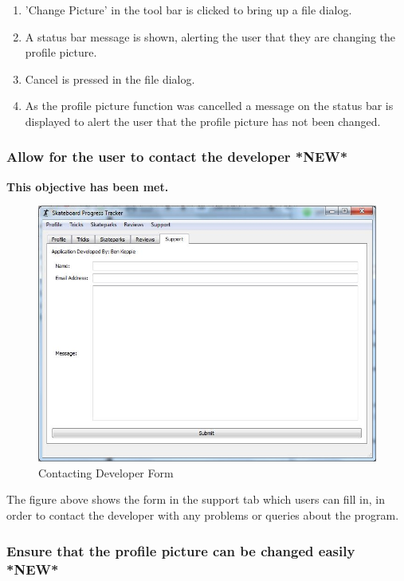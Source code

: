 \begin{enumerate}
\item 'Change Picture' in the tool bar is clicked to bring up a file dialog.
\item A status bar message is shown, alerting the user that they are changing the profile picture.
\item Cancel is pressed in the file dialog.
\item As the profile picture function was cancelled a message on the status bar is displayed to alert the user that the profile picture has not been changed.
\end{enumerate}

\subsubsection {Allow for the user to contact the developer *NEW*}

\textbf{This objective has been met.}


\begin{figure}[H]
    \includegraphics[width=\textwidth]{./Evaluation/images/Contactsupport.jpg}
    \caption{Contacting Developer Form} \label{fig:ContactSupportEVD}
\end{figure}

The figure above shows the form in the support tab which users can fill in, in order to contact the developer with any problems or queries about the program.



\subsubsection {Ensure that the profile picture can be changed easily *NEW*} 

